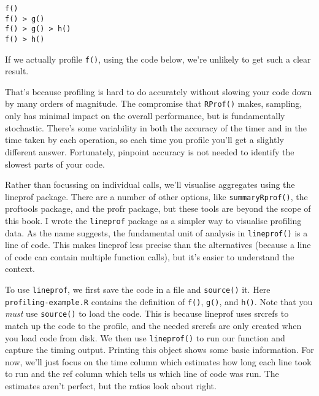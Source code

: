 \begin{verbatim}
f() 
f() > g()
f() > g() > h()
f() > h()
\end{verbatim}

If we actually profile \texttt{f()}, using the code below, we're
unlikely to get such a clear result.

\begin{Shaded}
\begin{Highlighting}[]
\StringTok{ }\NormalTok{()}
 \NormalTok{)}
\NormalTok{()}
\NormalTok{(}\NormalTok{)}
\end{Highlighting}
\end{Shaded}

That's because profiling is hard to do accurately without slowing your
code down by many orders of magnitude. The compromise that
\texttt{RProf()} makes, sampling, only has minimal impact on the overall
performance, but is fundamentally stochastic. There's some variability
in both the accuracy of the timer and in the time taken by each
operation, so each time you profile you'll get a slightly different
answer. Fortunately, pinpoint accuracy is not needed to identify the
slowest parts of your code. 

Rather than focussing on individual calls, we'll visualise aggregates
using the lineprof package. There are a number of other options, like
\texttt{summaryRprof()}, the proftools package, and the profr package,
but these tools are beyond the scope of this book. I wrote the
\texttt{lineprof} package as a simpler way to visualise profiling data.
As the name suggests, the fundamental unit of analysis in
\texttt{lineprof()} is a line of code. This makes lineprof less precise
than the alternatives (because a line of code can contain multiple
function calls), but it's easier to understand the context.

To use \texttt{lineprof}, we first save the code in a file and
\texttt{source()} it. Here \texttt{profiling-example.R} contains the
definition of \texttt{f()}, \texttt{g()}, and \texttt{h()}. Note that
you \emph{must} use \texttt{source()} to load the code. This is because
lineprof uses srcrefs to match up the code to the profile, and the
needed srcrefs are only created when you load code from disk. We then
use \texttt{lineprof()} to run our function and capture the timing
output. Printing this object shows some basic information. For now,
we'll just focus on the time column which estimates how long each line
took to run and the ref column which tells us which line of code was
run. The estimates aren't perfect, but the ratios look about right.


